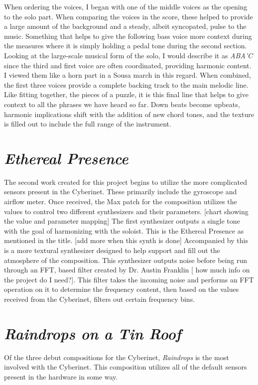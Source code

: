 When ordering the voices, I began with one of the middle voices as the opening to the solo part. When comparing the voices in the score, these helped to provide a large amount of the background and a steady, albeit syncopated, pulse to the music. Something that helps to give the following bass voice more context during the measures where it is simply holding a pedal tone during the second section. Looking at the large-scale musical form of the solo, I would describe it as \emph{ABA'C} since the third and first voice are often coordinated, providing harmonic content. I viewed them like a horn part in a Sousa march in this regard. When combined, the first three voices provide a complete backing track to the main melodic line. Like fitting together, the pieces of a puzzle, it is this final line that helps to give context to all the phrases we have heard so far. Down beats become upbeats, harmonic implications shift with the addition of new chord tones, and the texture is filled out to include the full range of the instrument.


\section{\textit{Ethereal Presence}}
The second work created for this project begins to utilize the more complicated sensors present in the Cyberinet. These primarily include the gyroscope and airflow meter. Once received, the Max patch for the composition utilizes the values to control two different synthesizers and their parameters. 
[chart showing the value and parameter mapping]
The first synthesizer outputs a single tone with the goal of harmonizing with the soloist. This is the Ethereal Presence as mentioned in the title. [add more when this synth is done]
Accompanied by this is a more textural synthesizer designed to help support and fill out the atmosphere of the composition. This synthesizer outputs noise before being run through an FFT, based filter created by Dr. Austin Franklin [ how much info on the project do I need?]. This filter takes the incoming noise and performs an FFT operation on it to determine the frequency content, then based on the values received from the Cyberinet, filters out certain frequency bins. 


\section{\textit{Raindrops on a Tin Roof}}
Of the three debut compositions for the Cyberinet, \textit{Raindrops} is the most involved with the Cyberinet. This composition utilizes all of the default sensors present in the hardware in some way. 

